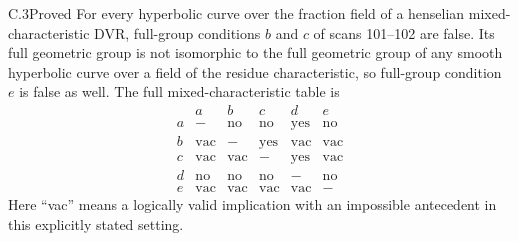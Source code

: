 \begin{claim}{C.3}{Proved}
For every hyperbolic curve over the fraction field of a henselian
mixed-characteristic DVR, full-group conditions $b$ and $c$ of scans
101--102 are false. Its full geometric group is not isomorphic to the full
geometric group of any smooth hyperbolic curve over a field of the residue
characteristic, so full-group condition $e$ is false as well. The full
mixed-characteristic table is
\[
\begin{array}{c|ccccc}
 &a&b&c&d&e\\\hline
a&-&\mathrm{no}&\mathrm{no}&\mathrm{yes}&\mathrm{no}\\
b&\mathrm{vac}&-&\mathrm{yes}&\mathrm{vac}&\mathrm{vac}\\
c&\mathrm{vac}&\mathrm{vac}&-&\mathrm{yes}&\mathrm{vac}\\
d&\mathrm{no}&\mathrm{no}&\mathrm{no}&-&\mathrm{no}\\
e&\mathrm{vac}&\mathrm{vac}&\mathrm{vac}&\mathrm{vac}&-
\end{array}
\]
Here ``vac'' means a logically valid implication with an impossible
antecedent in this explicitly stated setting.
\end{claim}
